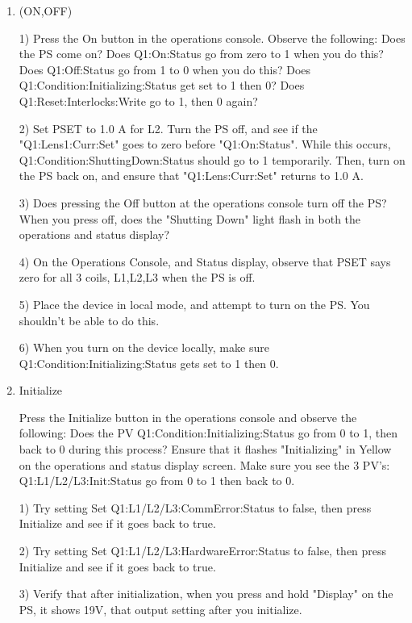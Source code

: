 \documentclass[11pt]{book}		%
\begin{document}
\begin{enumerate}
 
\item (ON,OFF) 

\color{red}
1) Press the On button in the operations console. Observe the following: 
	Does the PS come on? 
	Does Q1:On:Status go from zero to 1 when you do this? 
	Does Q1:Off:Status go from 1 to 0 when you do this? 
	Does Q1:Condition:Initializing:Status get set to 1 then 0?
	Does Q1:Reset:Interlocks:Write go to 1, then 0 again?

2) Set PSET to 1.0 A for L2. Turn the PS off, and see if the "Q1:Lens1:Curr:Set" goes to zero before "Q1:On:Status". While this occurs, Q1:Condition:ShuttingDown:Status should go to 1 temporarily. Then, turn on the PS back on, and ensure that "Q1:Lens:Curr:Set" returns to 1.0 A.

3) Does pressing the Off button at the operations console turn off the PS? When you press off, does the "Shutting Down" light flash in both the operations and status display?

4) On the Operations Console, and Status display, observe that PSET says zero for all 3 coils, L1,L2,L3 when the PS is off.

5) Place the device in local mode, and attempt to turn on the PS. You shouldn't be able to do this.

6) When you turn on the device locally, make sure Q1:Condition:Initializing:Status gets set to 1 then 0.


\color{black}

 \item Initialize

\color{red}

Press the Initialize button in the operations console and observe the following: 
	Does the PV Q1:Condition:Initializing:Status go from 0 to 1, then back to 0 during this process? 
	Ensure that it flashes "Initializing" in Yellow on the operations and status display screen. 
	Make sure you see the 3 PV's: Q1:L1/L2/L3:Init:Status go from 0 to 1 then back to 0.

1) Try setting Set Q1:L1/L2/L3:CommError:Status to false, then press Initialize and see if it goes back to true.

2) Try setting Set Q1:L1/L2/L3:HardwareError:Status to false, then press Initialize and see if it goes back to true.

3) Verify that after initialization, when you press and hold "Display" on the PS, it shows 19V, that output setting after you initialize.


\end{enumerate}
\end{document}
